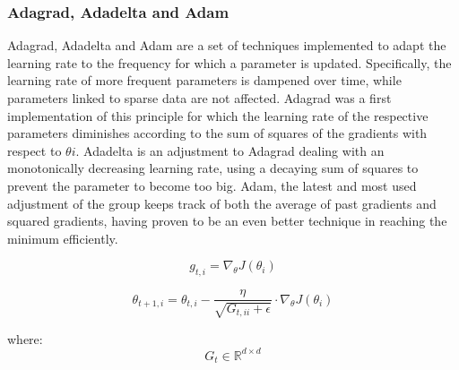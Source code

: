 \subsubsection{Adagrad, Adadelta and Adam \label{subsubsec:aaa}}
Adagrad, Adadelta and Adam are a set of techniques implemented to adapt the learning rate to the frequency for which a parameter is updated. Specifically, the learning rate of more frequent parameters is dampened over time, while parameters linked to sparse data are not affected. Adagrad was a first implementation of this principle for which the learning rate of the respective parameters diminishes according to the sum of squares of the gradients with respect to $\theta{i}$. Adadelta is an adjustment to  Adagrad dealing with an monotonically decreasing learning rate, using a decaying sum of squares to prevent the parameter to become too big. Adam, the latest and most used adjustment of the group keeps track of both the average of past gradients and squared gradients, having proven to be an even better technique in reaching the minimum efficiently.





$$ g_{t, i} = \nabla_\theta J( \theta_i ) $$


$$ \theta_{t+1, i} = \theta_{t, i} - \dfrac{\eta}{\sqrt{G_{t, ii} + \epsilon}} \cdot \nabla_\theta J( \theta_i )  $$


where:
$$G_{t} \in \mathbb{R}^{d \times d}$$

